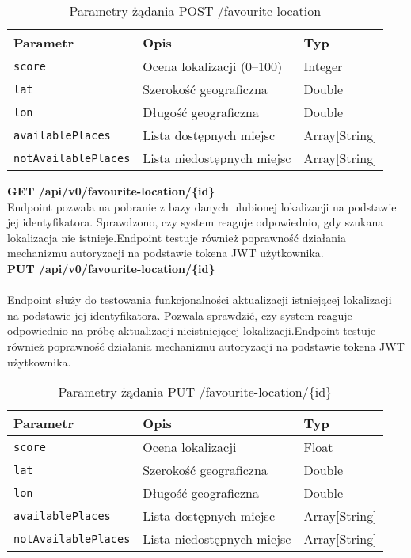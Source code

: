 \documentclass{article}
\begin{document}
\begin{table}[h!]
\centering
\begin{tabular}{|l|l|l|}
\hline
\textbf{Parametr} & \textbf{Opis} & \textbf{Typ} \\
\hline
\texttt{score} & Ocena lokalizacji (0–100) & Integer \\
\texttt{lat} & Szerokość geograficzna & Double \\
\texttt{lon} & Długość geograficzna & Double \\
\texttt{availablePlaces} & Lista dostępnych miejsc & Array[String] \\
\texttt{notAvailablePlaces} & Lista niedostępnych miejsc & Array[String] \\
\hline
\end{tabular}
\caption{Parametry żądania POST /favourite-location}
\end{table}


\noindent\textbf{GET /api/v0/favourite-location/\{id\}}
\\

\noindent
Endpoint pozwala na pobranie z bazy danych ulubionej lokalizacji na podstawie jej identyfikatora. Sprawdzono, czy system reaguje odpowiednio, gdy szukana lokalizacja nie istnieje.Endpoint testuje również poprawność działania mechanizmu autoryzacji na podstawie tokena JWT użytkownika.
\\

\noindent\textbf{PUT /api/v0/favourite-location/\{id\}}
\\
\\
Endpoint służy do testowania funkcjonalności aktualizacji istniejącej lokalizacji na podstawie jej identyfikatora. Pozwala sprawdzić, czy system reaguje odpowiednio na próbę aktualizacji nieistniejącej lokalizacji.Endpoint testuje również poprawność działania mechanizmu autoryzacji na podstawie tokena JWT użytkownika. 

\begin{table}[h!]
\centering
\begin{tabular}{|l|l|l|}
\hline
\textbf{Parametr} & \textbf{Opis} & \textbf{Typ} \\
\hline
\texttt{score} & Ocena lokalizacji & Float \\
\texttt{lat} & Szerokość geograficzna & Double \\
\texttt{lon} & Długość geograficzna & Double \\
\texttt{availablePlaces} & Lista dostępnych miejsc & Array[String] \\
\texttt{notAvailablePlaces} & Lista niedostępnych miejsc & Array[String] \\
\hline
\end{tabular}
\caption{Parametry żądania PUT /favourite-location/\{id\}}
\end{table}
\end{document}
